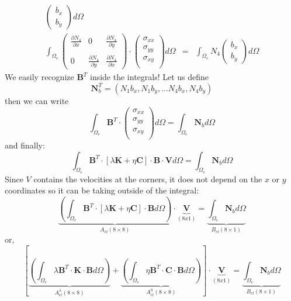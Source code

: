 \begin{eqnarray}
\left(
\begin{array}{c}
b_x \\ b_y
\end{array}
\right)
d\Omega \\
\int_{\Omega_e} 
\left(
\begin{array}{ccc}
\frac{\partial N_4}{\partial x} & 0 & \frac{\partial N_4}{\partial y} \\  \\
0 & \frac{\partial N_4}{\partial y} &  \frac{\partial N_4}{\partial x}  
\end{array}
\right)
\cdot
\left(
\begin{array}{c}
\sigma_{xx}\\
\sigma_{yy}\\
\sigma_{xy}\\
\end{array}
\right)
d\Omega &=& \int_{\Omega_e} N_4 
\left(
\begin{array}{c}
b_x \\ b_y
\end{array}
\right)
d\Omega 
\end{eqnarray}
We easily recognize ${\bm B}^T$ inside the integrals!
Let us define 
\[
{\bm N}_b^T=(N_1 b_x , N_1 b_y, ... N_4 b_x, N_4 b_y)
\]
then we can write
\[
\int_{\Omega_e} {\bm B}^T \cdot 
\left(
\begin{array}{c}
\sigma_{xx}\\
\sigma_{yy}\\
\sigma_{xy}\\
\end{array}
\right)
d\Omega
=
\int_{\Omega_e} {\bm N}_b d\Omega 
\]
and finally:
\[
\int_{\Omega_e} {\bm B}^T \cdot [ \lambda {\bm K} + \eta {\bm C} ] \cdot {\bm B} \cdot {\bm V} d\Omega
=
\int_{\Omega_e} {\bm N}_b d\Omega 
\]
Since $V$ contains the velocities at the corners, it does not depend on the $x$ or $y$ coordinates
so it can be taking outside of the integral:
\[
\underbrace{
\left(\int_{\Omega_e} {\bm B}^T \cdot [ \lambda {\bm K} + \eta {\bm C} ] \cdot {\bm B} d\Omega \right) 
}_{A_{el}(8 \times 8)}
\cdot 
\underbrace{
{\bm V}
}_{(8x1)}
=
\underbrace{
\int_{\Omega_e} {\bm N}_b d\Omega 
}_{B_{el} (8\times 1)}
\]
or, 
\[
\left[
\underbrace{
\left(\int_{\Omega_e} \lambda {\bm B}^T \cdot {\bm K} \cdot {\bm B} d\Omega \right) 
}_{A_{el}^\lambda(8 \times 8)}
+
\underbrace{
\left(\int_{\Omega_e}  \eta {\bm B}^T \cdot {\bm C}  \cdot {\bm B} d\Omega \right) 
}_{A_{el}^\eta(8 \times 8)}
\right]
\cdot 
\underbrace{
{\bm V}
}_{(8x1)}
=
\underbrace{
\int_{\Omega_e} {\bm N}_b d\Omega 
}_{B_{el} (8\times 1)}
\]

